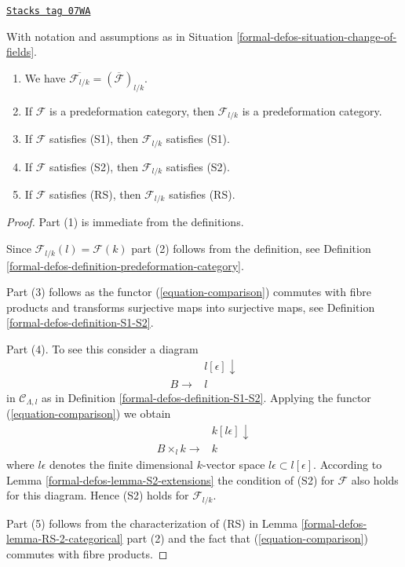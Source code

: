 \begin{lemma}
\label{formal-defos-lemma-elementary-properties-change-of-field}
\href{https://stacks.math.columbia.edu/tag/07WA}{\texttt{Stacks tag 07WA}}

With notation and assumptions as in Situation \ref{formal-defos-situation-change-of-fields}.
\begin{enumerate}
\item We have $\overline{\mathcal{F}_{l/k}} = (\overline{\mathcal{F}})_{l/k}$.
\item If $\mathcal{F}$ is a predeformation category, then $\mathcal{F}_{l/k}$
is a predeformation category.
\item If $\mathcal{F}$ satisfies (S1), then $\mathcal{F}_{l/k}$
satisfies (S1).
\item If $\mathcal{F}$ satisfies (S2), then $\mathcal{F}_{l/k}$
satisfies (S2).
\item If $\mathcal{F}$ satisfies (RS), then $\mathcal{F}_{l/k}$
satisfies (RS).
\end{enumerate}
\end{lemma}

\begin{proof}
Part (1) is immediate from the definitions.

\medskip\noindent
Since $\mathcal{F}_{l/k}(l) = \mathcal{F}(k)$ part (2) follows from the
definition, see Definition \ref{formal-defos-definition-predeformation-category}.

\medskip\noindent
Part (3) follows as the functor (\ref{equation-comparison}) commutes with
fibre products and transforms surjective maps into surjective maps, see
Definition \ref{formal-defos-definition-S1-S2}.

\medskip\noindent
Part (4). To see this consider a diagram
$$
\begin{array}{cc} & l[\epsilon] \downarrow \\ B  \longrightarrow & l\end{array}
$$
in $\mathcal{C}_{\Lambda, l}$ as in Definition \ref{formal-defos-definition-S1-S2}.
Applying the functor (\ref{equation-comparison}) we obtain
$$
\begin{array}{cc} & k[l\epsilon] \downarrow \\ B \times_l k  \longrightarrow & k\end{array}
$$
where $l\epsilon$ denotes the finite dimensional $k$-vector space
$l\epsilon \subset l[\epsilon]$. According to Lemma \ref{formal-defos-lemma-S2-extensions}
the condition of (S2) for $\mathcal{F}$ also holds for this diagram.
Hence (S2) holds for $\mathcal{F}_{l/k}$.

\medskip\noindent
Part (5) follows from the characterization of (RS) in
Lemma \ref{formal-defos-lemma-RS-2-categorical} part (2) and the fact that
(\ref{equation-comparison}) commutes with fibre products.
\end{proof}

